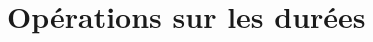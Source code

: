 \chapter{Opérations sur les durées}
\label{ChDurees}


\cours


\exercicesbase
\begin{colonne*exercice}

\end{colonne*exercice}


\exercicesappr
\begin{colonne*exercice}

\end{colonne*exercice}

